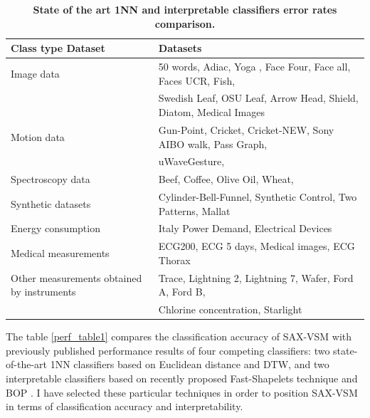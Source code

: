 \begin{table}[t]
\caption{\bf State of the art 1NN and interpretable classifiers error rates comparison.}
\vspace{0.4cm}
 \label{data_typetable1}
\centering
{\setlength{\extrarowheight}{2pt}%
{\footnotesize
\begin{tabularx}{\linewidth}{@{} l l @{}}
\hline
Class type Dataset & Datasets \\[0.5ex]
\hline
Image data & 50 words, Adiac, Yoga , Face Four, Face all, Faces UCR, Fish, \\
 & Swedish Leaf, OSU Leaf, Arrow Head, Shield, Diatom, Medical Images \\[0.5ex]
Motion data & Gun-Point, Cricket, Cricket-NEW, Sony AIBO walk, Pass Graph, \\ 
 & uWaveGesture, \\[0.5ex]
Spectroscopy data & Beef, Coffee, Olive Oil, Wheat, \\[0.5ex]
Synthetic datasets & Cylinder-Bell-Funnel, Synthetic Control, Two Patterns, Mallat \\[0.5ex]
Energy consumption & Italy Power Demand, Electrical Devices \\[0.5ex]
Medical measurements & ECG200, ECG 5 days, Medical images, ECG Thorax \\[0.5ex]
Other measurements obtained by instruments & Trace, Lightning 2, Lightning 7, Wafer, Ford A, Ford B, \\
 & Chlorine concentration, Starlight \\[0.5ex]
\hline
\end{tabularx}
}}
\end{table}

The table \ref{perf_table1} compares the classification accuracy of \mbox{SAX-VSM} with previously published 
performance results of four competing classifiers: 
two state-of-the-art 1NN classifiers based on Euclidean distance and DTW, 
and two interpretable classifiers based on recently proposed Fast-Shapelets technique \cite{fast-shapelets} 
and BOP \cite{bag_patterns}.
I have selected these particular techniques in order to position SAX-VSM in terms of classification accuracy and 
interpretability. 

